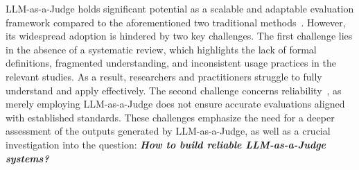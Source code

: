 LLM-as-a-Judge holds significant potential as a scalable and adaptable evaluation framework compared to the aforementioned two traditional methods~\cite{self_taught}. However, its widespread adoption is hindered by two key challenges. The first challenge lies in the absence of a systematic review, which highlights the lack of formal definitions, fragmented understanding, and inconsistent usage practices in the relevant studies. As a result, researchers and practitioners struggle to fully understand and apply effectively. The second challenge concerns reliability~\cite{yu2024xfinder}, as merely employing LLM-as-a-Judge does not ensure accurate evaluations aligned with established standards. 
These challenges emphasize the need for a deeper assessment of the outputs generated by LLM-as-a-Judge, as well as a crucial investigation into the question: \textbf{\textit{How to build reliable LLM-as-a-Judge systems?}}

